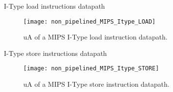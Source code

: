 % 


% 
\begin{frame}{I-Type load instructions datapath}
  \begin{figure}
  \centering
  \texttt{[image: non\_pipelined\_MIPS\_Itype\_LOAD]}
  \vspace{-3pt}
  \caption{\ac{uA} of a \ac{MIPS} I-Type load instruction datapath.}
  \label{Figure:non_pipelined_MIPS_Itype_LOAD}
  \end{figure}
\end{frame}

% 
\begin{frame}{I-Type store instructions datapath}
  \begin{figure}
  \centering
  \texttt{[image: non\_pipelined\_MIPS\_Itype\_STORE]}
  \vspace{-3pt}
  \caption{\ac{uA} of a \ac{MIPS} I-Type store instruction datapath.}
  \label{Figure:non_pipelined_MIPS_Itype_STORE}
  \end{figure}
\end{frame}

